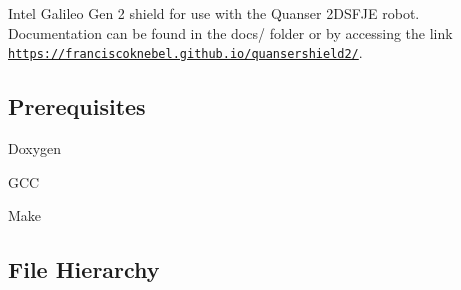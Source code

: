 Intel Galileo Gen 2 shield for use with the Quanser 2\+D\+S\+F\+JE robot. Documentation can be found in the {\ttfamily docs/} folder or by accessing the link \href{https://franciscoknebel.github.io/quansershield2/}{\tt https\+://franciscoknebel.\+github.\+io/quansershield2/}.

\subsection*{Prerequisites}


\begin{DoxyItemize}
\item Doxygen 

\item G\+CC
\item Make
\end{DoxyItemize}

\subsection*{File Hierarchy}


